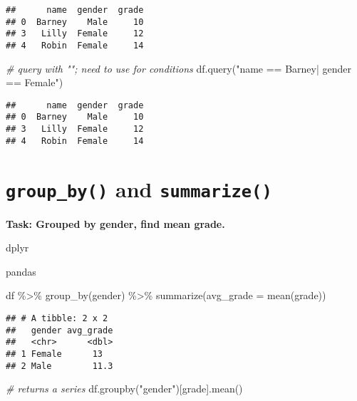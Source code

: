 \documentclass[
]{book}
\newenvironment{Shaded}{\begin{snugshade}}{\end{snugshade}}
\newcommand{\AttributeTok}[1]{\textcolor[rgb]{0.77,0.63,0.00}{#1}}
\newcommand{\CommentTok}[1]{\textcolor[rgb]{0.56,0.35,0.01}{\textit{#1}}}
\newcommand{\FunctionTok}[1]{\textcolor[rgb]{0.00,0.00,0.00}{#1}}
\newcommand{\NormalTok}[1]{#1}
\newcommand{\SpecialCharTok}[1]{\textcolor[rgb]{0.00,0.00,0.00}{#1}}
\newcommand{\StringTok}[1]{\textcolor[rgb]{0.31,0.60,0.02}{#1}}
\begin{document}
\begin{verbatim}
##      name  gender  grade
## 0  Barney    Male     10
## 3   Lilly  Female     12
## 4   Robin  Female     14
\end{verbatim}

\begin{Shaded}
\begin{Highlighting}[]
\CommentTok{\# query with ""; need to use \textquotesingle{}\textquotesingle{} for conditions}
\NormalTok{df.query(}\StringTok{"name == \textquotesingle{}Barney\textquotesingle{}| gender == \textquotesingle{}Female\textquotesingle{}"}\NormalTok{)}
\end{Highlighting}
\end{Shaded}

\begin{verbatim}
##      name  gender  grade
## 0  Barney    Male     10
## 3   Lilly  Female     12
## 4   Robin  Female     14
\end{verbatim}

\hypertarget{group_by-and-summarize}{%
\section{\texorpdfstring{\texttt{group\_by()} and \texttt{summarize()}}{group\_by() and summarize()}}\label{group_by-and-summarize}}

{\textbf{Task: Grouped by gender, find mean grade.
}}

dplyr

pandas

\begin{Shaded}
\begin{Highlighting}[]
\NormalTok{df }\SpecialCharTok{\%\textgreater{}\%} 
  \FunctionTok{group\_by}\NormalTok{(gender) }\SpecialCharTok{\%\textgreater{}\%} 
  \FunctionTok{summarize}\NormalTok{(}\AttributeTok{avg\_grade =} \FunctionTok{mean}\NormalTok{(grade))}
\end{Highlighting}
\end{Shaded}

\begin{verbatim}
## # A tibble: 2 x 2
##   gender avg_grade
##   <chr>      <dbl>
## 1 Female      13  
## 2 Male        11.3
\end{verbatim}

\begin{Shaded}
\begin{Highlighting}[]
\CommentTok{\# returns a series}
\NormalTok{df.groupby(}\StringTok{"gender"}\NormalTok{)[}\StringTok{\textquotesingle{}grade\textquotesingle{}}\NormalTok{].mean()}
\end{Highlighting}
\end{Shaded}
\end{document}
